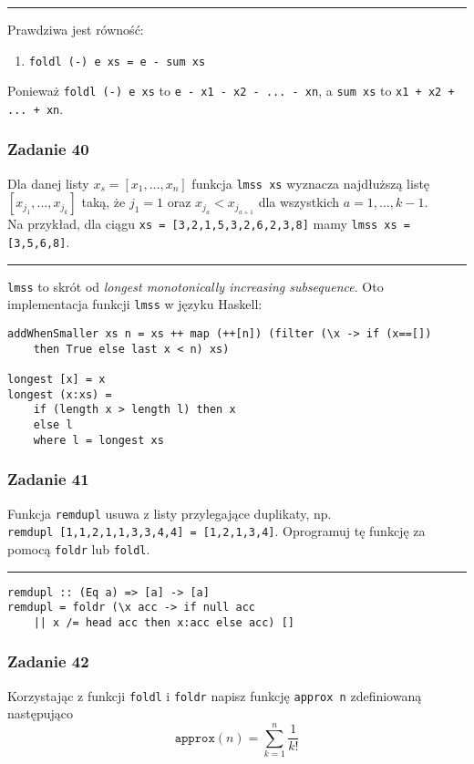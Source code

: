 \documentclass[11pt,a4paper]{article}
\begin{document}
\bigskip
\hrule
\bigskip

Prawdziwa jest równość:
\begin{enumerate}
    \item \texttt{foldl (-) e xs = e - sum xs}
\end{enumerate}
Ponieważ \texttt{foldl (-) e xs} to \texttt{e - x1 - x2 - ... - xn}, a \texttt{sum xs} to \texttt{x1 + x2 + ... + xn}.

\subsubsection{Zadanie 40}
Dla danej listy \texttt{$x_s = [x_1, \ldots, x_n]$} funkcja \texttt{lmss xs} wyznacza najdłuższą listę \texttt{$[x_{j_1}, \ldots, x_{j_k}]$} taką, że \texttt{$j_1 = 1$} oraz \texttt{$x_{j_a} < x_{j_{a+1}}$} dla wszystkich \texttt{$a = 1, \ldots, k - 1$}.\\
Na przykład, dla ciągu \texttt{xs = [3,2,1,5,3,2,6,2,3,8]} mamy \texttt{lmss xs = [3,5,6,8]}.

\bigskip
\hrule
\bigskip
\texttt{lmss} to skrót od \textit{longest monotonically increasing subsequence}. Oto implementacja funkcji \texttt{lmss} w języku Haskell:
\begin{Verbatim}[frame=single]
addWhenSmaller xs n = xs ++ map (++[n]) (filter (\x -> if (x==[])
    then True else last x < n) xs)

longest [x] = x
longest (x:xs) =
    if (length x > length l) then x
    else l
    where l = longest xs
\end{Verbatim}

\subsubsection{Zadanie 41}
Funkcja \texttt{remdupl} usuwa z listy przylegające duplikaty, np. \\ \texttt{remdupl [1,1,2,1,1,3,3,4,4] = [1,2,1,3,4]}. Oprogramuj tę funkcję za pomocą \texttt{foldr} lub \texttt{foldl}.

\bigskip
\hrule
\bigskip

\begin{Verbatim}[frame=single]
remdupl :: (Eq a) => [a] -> [a]
remdupl = foldr (\x acc -> if null acc
    || x /= head acc then x:acc else acc) []
\end{Verbatim}

\subsubsection{Zadanie 42}
Korzystając z funkcji \texttt{foldl} i \texttt{foldr} napisz funkcję \texttt{approx n} zdefiniowaną następująco
\[
\texttt{approx}(n) = \sum_{k=1}^{n} \frac{1}{k!}
\]
\end{document}
